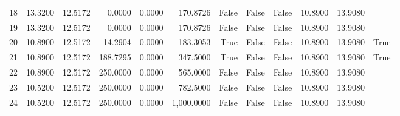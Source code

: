\begin{tabular}{rrrrrrrrrrrl}
18 & 13.3200 & 12.5172 & 0.0000 & 0.0000 & 170.8726 & False & False & False & 10.8900 & 13.9080 &  \\
19 & 13.3200 & 12.5172 & 0.0000 & 0.0000 & 170.8726 & False & False & False & 10.8900 & 13.9080 &  \\
20 & 10.8900 & 12.5172 & 14.2904 & 0.0000 & 183.3053 & True & False & False & 10.8900 & 13.9080 & True \\
21 & 10.8900 & 12.5172 & 188.7295 & 0.0000 & 347.5000 & True & False & False & 10.8900 & 13.9080 & True \\
22 & 10.8900 & 12.5172 & 250.0000 & 0.0000 & 565.0000 & False & False & False & 10.8900 & 13.9080 &  \\
23 & 10.5200 & 12.5172 & 250.0000 & 0.0000 & 782.5000 & False & False & False & 10.8900 & 13.9080 &  \\
24 & 10.5200 & 12.5172 & 250.0000 & 0.0000 & 1,000.0000 & False & False & False & 10.8900 & 13.9080 &  \\
\bottomrule
\end{tabular}
